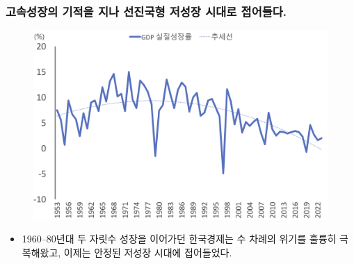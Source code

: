 \documentclass[aspectratio=169,xcolor=dvipsnames,handout]{beamer}
\begin{document}
\begin{frame}[<+->]
\frametitle{고속성장의 기적을 지나 선진국형 저성장 시대로 접어들다.}
    \begin{figure}
        \centering
        \includegraphics[width=.5\textwidth]{pic/fig_econ_02.png}
    \end{figure}
    \begin{itemize}
        \item 1960--80년대 두 자릿수 성장을 이어가던 한국경제는 수 차례의 위기를 훌륭히 극복해왔고, 이제는 안정된 저성장 시대에 접어들었다.
    \end{itemize}
\end{frame}
\end{document}
